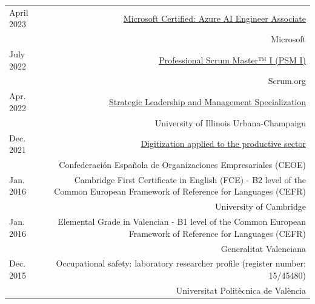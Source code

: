 \documentclass[10pt]{article}
\begin{document}
\begin{tabular}{L!{\VRule}R}
		April 2023 & \href{https://www.credly.com/badges/ae00ee42-a102-427f-878d-7ac2fd4897a6/linked_in_profile}{Microsoft Certified: Azure AI Engineer Associate}\\
		&\scriptsize{Microsoft} \vspace{5pt}\\
		July 2022 & \href{https://www.credly.com/badges/a7e78f19-3651-4195-a372-a25c8a2db812/linked_in_profile}{Professional Scrum Master™ I (PSM I)}\\
		&\scriptsize{Scrum.org} \vspace{5pt}\\
		Apr. 2022 & \href{https://www.coursera.org/account/accomplishments/specialization/certificate/X4K5KTD6P9CH}{Strategic Leadership and Management Specialization}\\
			&\scriptsize{University of Illinois Urbana-Champaign} \vspace{5pt}\\
   		Dec. 2021 & \href{}{Digitization applied to the productive sector}\\
		&\scriptsize{Confederación Española de Organizaciones Empresariales (CEOE)} \vspace{5pt}\\
		Jan. 2016 & Cambridge First Certificate in English (FCE) - B2 level of the Common European Framework of Reference for Languages (CEFR)\\
		&\scriptsize{University of Cambridge} \vspace{5pt}\\
		Jan. 2016 & Elemental Grade in Valencian - B1 level of the Common European Framework of Reference for Languages (CEFR)\\
		&\scriptsize{Generalitat Valenciana} \vspace{5pt}\\
		Dec. 2015 & Occupational safety: laboratory researcher profile (register number: 15/45480)\\
		&\scriptsize{Universitat Polit{\`e}cnica de Val{\`e}ncia} \vspace{5pt}\\
\end{tabular}
\end{document}

